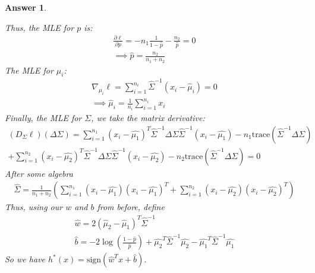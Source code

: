 \documentclass[12pt]{article}
\theoremstyle{colon}
\newtheorem*{answer}{Answer}
\begin{document}
\begin{answer}
\begin{enumerate}[label=\arabic*)]
      Thus, the MLE for $p$ is:
      \begin{gather*}
        \frac{\partial \ell}{\partial p} = -n_1 \frac{1}{1-\hat{p}} - \frac{n_2}{\hat{p}} = 0 \\
        \implies \hat{p} = \frac{n_2}{n_1 + n_2}
      \end{gather*}
      The MLE for $\mu_i$:
      \begin{gather*}
        \nabla_{\mu_i} \ell = \sum_{i=1}^{n_i} \hat{\Sigma}^{-1} (x_i - \hat{\mu}_i) = 0 \\
        \implies \hat{\mu}_i = \frac{1}{n_i} \sum_{i=1}^{n_i} x_i
      \end{gather*}
      Finally, the MLE for $\Sigma$, we take the matrix derivative:
      \begin{align*}
        (D_\Sigma \ell)(\Delta \Sigma) = \sum_{i=1}^{n_1} (x_i - \hat{\mu_1})^T \hat{\Sigma}^{-1} \Delta \Sigma \hat{\Sigma}^{-1} (x_i - \hat{\mu_1}) - n_1 \text{trace}(\hat{\Sigma}^{-1} \Delta \Sigma) \\
        + \sum_{i=1}^{n_2} (x_i - \hat{\mu_2})^T \hat{\Sigma}^{-1} \Delta \Sigma \hat{\Sigma}^{-1} (x_i - \hat{\mu_2}) - n_2 \text{trace}(\hat{\Sigma}^{-1} \Delta \Sigma) = 0
      \end{align*}
      After some algebra
      \begin{gather*}
        \hat{\Sigma} = \frac{1}{n_1 + n_2} \left( \sum_{i=1}^{n_1} (x_i - \hat{\mu_1})(x_i - \hat{\mu_1})^T + \sum_{i=1}^{n_2} (x_i - \hat{\mu_2})(x_i - \hat{\mu_2})^T \right)
      \end{gather*}
      Thus, using our $w$ and $b$ from before, define
      \begin{gather*}
        \hat{w} = 2(\hat{\mu}_2 - \hat{\mu}_1)^T \hat{\Sigma}^{-1} \\
        \hat{b} = -2\log \left( \frac{1-\hat{p}}{\hat{p}} \right) + \hat{\mu_2}^T \hat{\Sigma}^{-1} \hat{\mu_2} - \hat{\mu_1}^T \hat{\Sigma}^{-1} \hat{\mu_1}
      \end{gather*}
      So we have $h^*(x) = \text{sign} (\hat{w}^T x + \hat{b})$.


\end{enumerate}
\end{answer}
\end{document}
